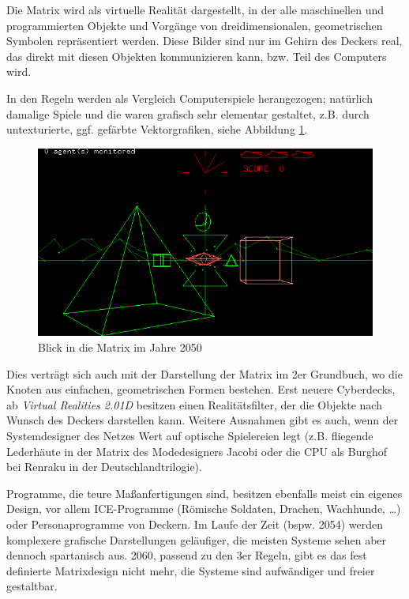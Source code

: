 \documentclass[a4paper]{scrartcl}
\begin{document}
Die Matrix wird als virtuelle Realität dargestellt, in der alle maschinellen und programmierten Objekte und Vorgänge von
dreidimensionalen, geometrischen Symbolen repräsentiert werden.
Diese Bilder sind nur im Gehirn des Deckers real, das direkt mit diesen Objekten kommunizieren kann, bzw. Teil des 
Computers wird.

In den Regeln werden als Vergleich Computerspiele herangezogen; natürlich damalige Spiele und die waren grafisch sehr
elementar gestaltet, z.B. durch untexturierte, ggf. gefärbte Vektorgrafiken, siehe Abbildung \ref{fig:Matrix2050}.
\begin{figure}[ht]
 \centering
 \includegraphics[scale=0.6]{Bilder/battlezone}
 \caption{Blick in die Matrix im Jahre 2050}
 \label{fig:Matrix2050}
\end{figure}

Dies verträgt sich auch mit der Darstellung der Matrix im 2er Grundbuch, wo die Knoten aus einfachen, geometrischen Formen
bestehen.
Erst neuere Cyberdecks, ab \textit{Virtual Realities 2.01D} besitzen einen Realitätsfilter, der die Objekte nach Wunsch 
des Deckers darstellen kann.
Weitere Ausnahmen gibt es auch, wenn der Systemdesigner des Netzes Wert auf optische Spielereien legt (z.B. fliegende
Lederhäute in der Matrix des Modedesigners Jacobi oder die CPU als Burghof bei Renraku in der Deutschlandtrilogie).

Programme, die teure Maßanfertigungen sind, besitzen ebenfalls meist ein eigenes Design, vor allem ICE-Programme 
(Römische Soldaten, Drachen, Wachhunde, \dots) oder Personaprogramme von Deckern.
Im Laufe der Zeit (bspw. 2054) werden komplexere grafische Darstellungen geläufiger, die meisten Systeme sehen aber 
dennoch spartanisch aus.
2060, passend zu den 3er Regeln, gibt es das fest definierte Matrixdesign nicht mehr, die Systeme sind aufwändiger
und freier gestaltbar.
\end{document}
